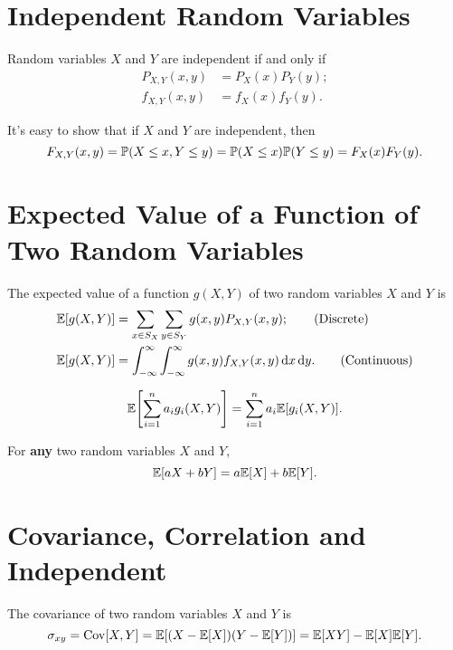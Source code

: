 \section{Independent Random Variables}
\begin{definition}
    Random variables $X$ and $Y$ are independent if and only if
    \begin{align}
        P_{X,Y}(x,y) &=P_X(x)P_Y(y); \tag{Discrete}\\
        f_{X,Y}(x,y) &=f_X(x)f_Y(y). \tag{Continuous}
    \end{align}
\end{definition}
It's easy to show that if $X$ and $Y$ are independent, then 
\[F_{X,Y}(x,y)=\P{X\leq x, Y\leq y}=\P{X\leq x}\P{Y\leq y}=F_X(x)F_Y(y).\]

\section{Expected Value of a Function of Two Random Variables}
\begin{theorem}
    The expected value of a function $g(X,Y)$ of two random variables $X$ and $Y$ is
    \begin{align}
        \E{g(X,Y)} &= \sum_{x\in S_X}\sum_{y\in S_Y}g(x,y)P_{X,Y}(x,y); \tag{Discrete}\\
        \E{g(X,Y)} &= \int_{-\infty}^{\infty}\int_{-\infty}^{\infty}g(x,y)f_{X,Y}(x,y)\diff x\diff y. \tag{Continuous}
    \end{align}
\end{theorem} 

\begin{theorem}
    \[\E{\sum_{i=1}^{n}a_i g_i(X,Y)}=\sum_{i=1}^{n}a_i\E{g_i(X,Y)}.\]
\end{theorem}

\begin{theorem}
    For \textbf{any} two random variables $X$ and $Y$,
    \[\E{aX+bY}=a\E{X}+b\E{Y}.\]    
\end{theorem}

\section{Covariance, Correlation and Independent}
\begin{definition}[Covariance]
    The covariance of two random variables $X$ and $Y$ is
    \[\sigma_{xy}=\Cov[X,Y]=\E{(X-\E{X})(Y-\E{Y})}=\E{XY}-\E{X}\E{Y}.\]
\end{definition}


